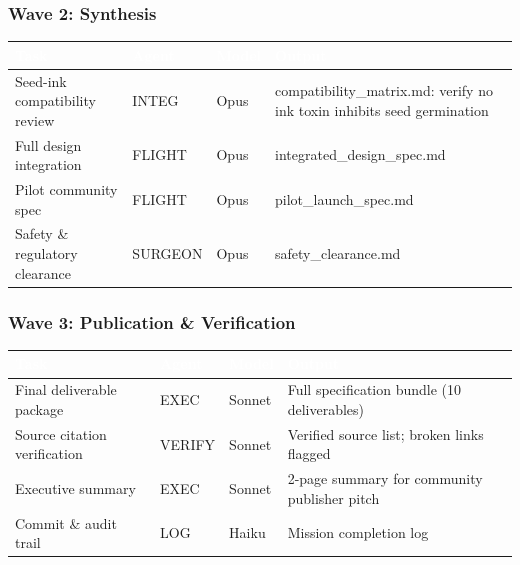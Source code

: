\documentclass[11pt,letterpaper]{article}
\newcommand{\tableheader}[1]{\textbf{\sffamily\textcolor{white}{#1}}}
\begin{document}
\subsubsection{Wave 2: Synthesis}
\begin{center}
\begin{tabularx}{\textwidth}{L{3.5cm}L{2.5cm}C{2cm}X}
\toprule
{}
\tableheader{Task} & \tableheader{Agent} & \tableheader{Model} & \tableheader{Output} \\
\midrule
Seed-ink compatibility review & INTEG & Opus & compatibility\_matrix.md: verify no ink toxin inhibits seed germination \\
Full design integration & FLIGHT & Opus & integrated\_design\_spec.md \\
Pilot community spec & FLIGHT & Opus & pilot\_launch\_spec.md \\
Safety \& regulatory clearance & SURGEON & Opus & safety\_clearance.md \\
\bottomrule
\end{tabularx}
\end{center}

\subsubsection{Wave 3: Publication \& Verification}
\begin{center}
\begin{tabularx}{\textwidth}{L{3.5cm}L{2.5cm}C{2cm}X}
\toprule
{}
\tableheader{Task} & \tableheader{Agent} & \tableheader{Model} & \tableheader{Output} \\
\midrule
Final deliverable package & EXEC & Sonnet & Full specification bundle (10 deliverables) \\
Source citation verification & VERIFY & Sonnet & Verified source list; broken links flagged \\
Executive summary & EXEC & Sonnet & 2-page summary for community publisher pitch \\
Commit \& audit trail & LOG & Haiku & Mission completion log \\
\bottomrule
\end{tabularx}
\end{center}
\end{document}
